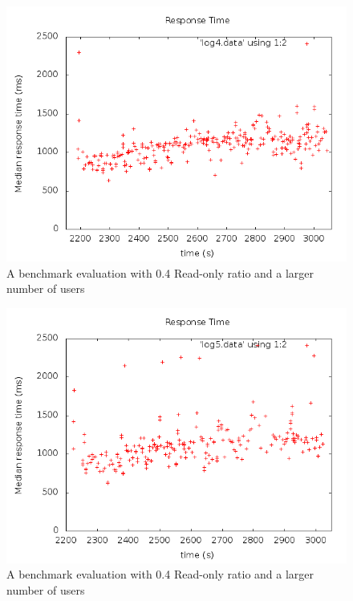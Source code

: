 \begin{figure}[ht]
  \centering %
  \includegraphics[scale=0.5]{src/img/out4.png}
  \caption{A benchmark evaluation with 0.4 Read-only ratio and a larger number of users}
\label{figure:graph4}
\end{figure}

\begin{figure}[ht]
  \centering %
  \includegraphics[scale=0.5]{src/img/out5.png}
  \caption{A benchmark evaluation with 0.4 Read-only ratio and a larger number of users}
\label{figure:graph5}
\end{figure}
